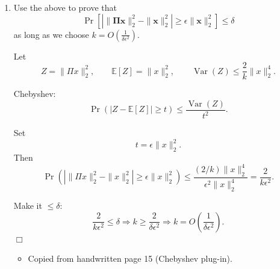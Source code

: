 \documentclass[10pt]{article}
\newcommand{\spara}[1]{\vspace{.5em}\noindent {\large\sffamily\textcolor{nyuOfficialPurple}{#1}}}
\newcommand{\E}{\mathbb{E}}
\DeclareMathOperator{\Var}{Var}
\newcommand{\bs}[1]{\boldsymbol{#1}}
\newcommand{\bv}[1]{\mathbf{#1}}
\begin{document}
\begin{enumerate}[label=\arabic*.]
\item Use the above to prove that
\[
\Pr\!\left[\left|\|\bs{\Pi}\bv{x}\|_2^2 - \|\bv{x}\|_2^2\right| \geq \epsilon\|\bv{x}\|_2^2 \right] \leq \delta
\]
as long as we choose $k = O\!\left(\frac{1}{\delta\epsilon^2}\right)$.

\spara{Pr. 5.2}

Let
\[
Z=\|\Pi x\|_2^2,
\qquad
\E[Z]=\|x\|_2^2,
\qquad
\Var(Z)\le \frac{2}{k}\|x\|_2^4.
\]

Chebyshev:
\[
\Pr(|Z-\E[Z]|\ge t)\le \frac{\Var(Z)}{t^2}.
\]

Set
\[
t=\epsilon\|x\|_2^2.
\]
Then
\[
\Pr\!\left(|\|\Pi x\|_2^2-\|x\|_2^2|\ge \epsilon\|x\|_2^2\right)
\le
\frac{(2/k)\|x\|_2^4}{\epsilon^2\|x\|_2^4}
=
\frac{2}{k\epsilon^2}.
\]

Make it $\le \delta$:
\[
\frac{2}{k\epsilon^2}\le \delta
\Rightarrow
k\ge \frac{2}{\delta\epsilon^2}
\Rightarrow
k=O\!\left(\frac{1}{\delta\epsilon^2}\right).
\]
\(\Box\)

\spara{Notes (Pr. 5.2)}
\begin{itemize}
\item Copied from handwritten page 15 (Chebyshev plug-in).
\end{itemize}

\end{enumerate}
\end{document}
